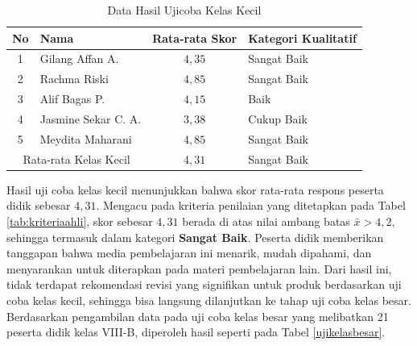 \begin{enumerate}
    \begin{table}[H]
        \centering
        \caption{Data Hasil Ujicoba Kelas Kecil}
        \label{ujikelaskecil}
        \begin{tabular}{|c|l|c|l|}
            \hline
            \textbf{No} & \textbf{Nama} & \textbf{Rata-rata Skor} & \textbf{Kategori Kualitatif} \\
            \hline
            1 & Gilang Affan A. & \(4{,}35\) & Sangat Baik \\
            2 & Rachma Riski & \(4{,}85\) & Sangat Baik \\
            3 & Alif Bagas P. & \(4{,}15\) & Baik \\
            4 & Jasmine Sekar C. A. & \(3{,}38\) & Cukup Baik \\
            5 & Meydita Maharani & \(4{,}85\) & Sangat Baik \\
            \hline
            \multicolumn{2}{|c|}{Rata-rata Kelas Kecil} & \(4{,}31\) & Sangat Baik \\
            \hline
        \end{tabular}
    \end{table}
    Hasil uji coba kelas kecil menunjukkan bahwa skor rata-rata respons peserta didik sebesar \(4{,}31\). Mengacu pada kriteria penilaian yang ditetapkan pada Tabel \ref{tab:kriteriaahli}, skor sebesar \(4{,}31\) berada di atas nilai ambang batas \(\bar{x} > 4{,}2\), sehingga termasuk dalam kategori \textbf{Sangat Baik}. Peserta didik memberikan tanggapan bahwa media pembelajaran ini menarik, mudah dipahami, dan menyarankan untuk diterapkan pada materi pembelajaran lain. Dari hasil ini, tidak terdapat rekomendasi revisi yang signifikan untuk produk berdasarkan uji coba kelas kecil, sehingga bisa langsung dilanjutkan ke tahap uji coba kelas besar.\\
    \hspace*{1cm}Berdasarkan pengambilan data pada uji coba kelas besar yang melibatkan 21 peserta didik kelas VIII-B, diperoleh hasil seperti pada Tabel \ref{ujikelasbesar}.
    \begin{table}[H]

\end{table}
\end{enumerate}
